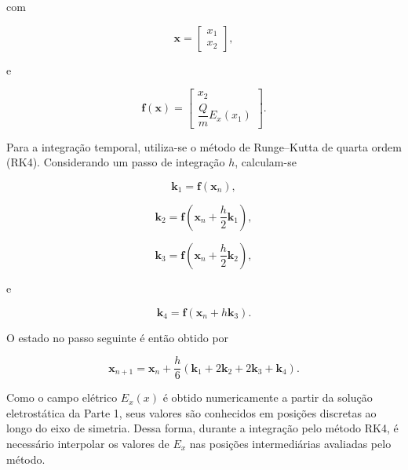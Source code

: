 \documentclass[12pt,a4paper]{article}
\begin{document}
com

\begin{equation}
\mathbf{x}
=
\begin{bmatrix}
x_1\\
x_2
\end{bmatrix},
\end{equation}

e

\begin{equation}
\mathbf{f}(\mathbf{x})
=
\begin{bmatrix}
x_2\\[0.2cm]
\dfrac{Q}{m}E_x(x_1)
\end{bmatrix}.
\end{equation}

Para a integração temporal, utiliza-se o método de Runge--Kutta de quarta
ordem (RK4). Considerando um passo de integração $h$, calculam-se

\begin{equation}
\mathbf{k}_1
=
\mathbf{f}(\mathbf{x}_n),
\end{equation}

\begin{equation}
\mathbf{k}_2
=
\mathbf{f}
\left(
\mathbf{x}_n
+
\frac{h}{2}\mathbf{k}_1
\right),
\end{equation}

\begin{equation}
\mathbf{k}_3
=
\mathbf{f}
\left(
\mathbf{x}_n
+
\frac{h}{2}\mathbf{k}_2
\right),
\end{equation}

e

\begin{equation}
\mathbf{k}_4
=
\mathbf{f}
\left(
\mathbf{x}_n
+
h\mathbf{k}_3
\right).
\end{equation}

O estado no passo seguinte é então obtido por

\begin{equation}
\boxed{
\mathbf{x}_{n+1}
=
\mathbf{x}_n
+
\frac{h}{6}
\left(
\mathbf{k}_1
+
2\mathbf{k}_2
+
2\mathbf{k}_3
+
\mathbf{k}_4
\right)
}.
\end{equation}

Como o campo elétrico $E_x(x)$ é obtido numericamente a partir da solução
eletrostática da Parte 1, seus valores são conhecidos em posições discretas ao
longo do eixo de simetria. Dessa forma, durante a integração pelo método RK4,
é necessário interpolar os valores de $E_x$ nas posições intermediárias
avaliadas pelo método.
\end{document}
